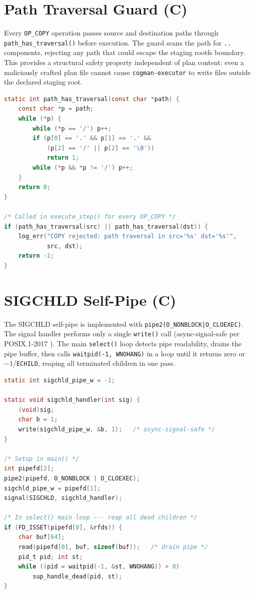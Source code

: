 \documentclass[12pt,a4paper]{report}
\begin{document}
\clearpage
\section{Path Traversal Guard (C)}

Every \texttt{OP\_COPY} operation passes source and destination paths through
\texttt{path\_has\_traversal()} before execution. The guard scans the path for
\texttt{..} components, rejecting any path that could escape the staging rootfs
boundary. This provides a structural safety property independent of plan content:
even a maliciously crafted plan file cannot cause \texttt{cogman-executor} to
write files outside the declared staging root.

\begin{lstlisting}[language=C, caption={path\_has\_traversal() and usage --- executor/ops/copy.c}]
static int path_has_traversal(const char *path) {
    const char *p = path;
    while (*p) {
        while (*p == '/') p++;
        if (p[0] == '.' && p[1] == '.' &&
            (p[2] == '/' || p[2] == '\0'))
            return 1;
        while (*p && *p != '/') p++;
    }
    return 0;
}

/* Called in execute_step() for every OP_COPY */
if (path_has_traversal(src) || path_has_traversal(dst)) {
    log_err("COPY rejected: path traversal in src='%s' dst='%s'",
            src, dst);
    return -1;
}
\end{lstlisting}

\clearpage
\section{SIGCHLD Self-Pipe (C)}

The SIGCHLD self-pipe is implemented with \texttt{pipe2(O\_NONBLOCK|O\_CLOEXEC)}.
The signal handler performs only a single \texttt{write()} call
(async-signal-safe per POSIX.1-2017 \cite{posix}). The main \texttt{select()}
loop detects pipe readability, drains the pipe buffer, then calls
\texttt{waitpid(-1, WNOHANG)} in a loop until it returns zero or
$-1$/\texttt{ECHILD}, reaping all terminated children in one pass.

\begin{lstlisting}[language=C, caption={SIGCHLD self-pipe setup and main-loop reaping --- supervisor/supervisor.c}]
static int sigchld_pipe_w = -1;

static void sigchld_handler(int sig) {
    (void)sig;
    char b = 1;
    write(sigchld_pipe_w, &b, 1);   /* async-signal-safe */
}

/* Setup in main() */
int pipefd[2];
pipe2(pipefd, O_NONBLOCK | O_CLOEXEC);
sigchld_pipe_w = pipefd[1];
signal(SIGCHLD, sigchld_handler);

/* In select() main loop --- reap all dead children */
if (FD_ISSET(pipefd[0], &rfds)) {
    char buf[64];
    read(pipefd[0], buf, sizeof(buf));   /* drain pipe */
    pid_t pid; int st;
    while ((pid = waitpid(-1, &st, WNOHANG)) > 0)
        sup_handle_dead(pid, st);
}
\end{lstlisting}
\end{document}
